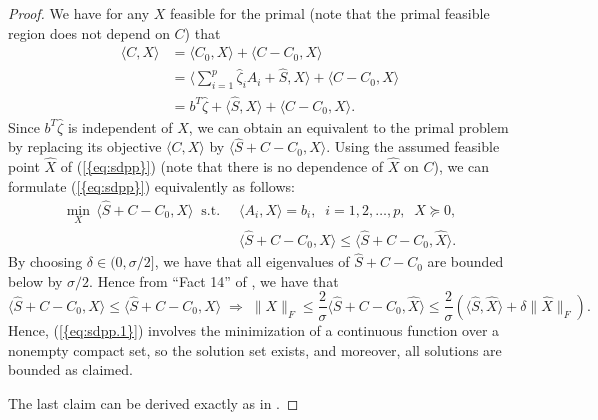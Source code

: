 \documentclass{siamltex}
\begin{document}
\begin{proof}
  We have for any $X$ feasible for the primal (note that the primal
  feasible region does not depend on $C$) that
\begin{align*}
\langle C,X \rangle &= \langle C_0,X \rangle +  \langle C-C_0,X \rangle \\
&= \langle \sum_{i=1}^p \hat{\zeta}_i A_i + \hat{S} ,X \rangle 
+  \langle C-C_0,X \rangle \\
&= b^T \hat{\zeta} + \langle \hat{S} ,X \rangle 
+  \langle C-C_0,X \rangle.
\end{align*}
Since $b^T \hat{\zeta}$ is independent of $X$, we can obtain an
equivalent to the primal problem by replacing its objective $\langle
C,X \rangle$ by $\langle \hat{S} + C-C_0,X \rangle$.  Using the
assumed feasible point $\hat{X}$ of {(\ref{{eq:sdpp}})} (note that there
is no dependence of $\hat{X}$ on $C$), we can formulate
{(\ref{{eq:sdpp}})} equivalently as follows:
\begin{subequations} \label{eq:sdpp.1}
\begin{align}
\min_X \, \langle \hat{S} + C-C_0 ,X \rangle \;\; \mbox{s.t.} \;\;& \langle A_i, X \rangle = b_i, \;\; i=1,2,\dotsc,p, \;\; X \succeq 0, \\
&\langle \hat{S} + C-C_0 ,X \rangle \le 
\langle \hat{S} + C-C_0 , \hat{X} \rangle.
\end{align}
\end{subequations}
By choosing $\delta \in (0, \sigma/2]$, we have that all eigenvalues
of $\hat{S} + C-C_0$ are bounded below by $\sigma/2$. Hence from
``Fact 14'' of \cite{Tod01a}, we have that
\[
\langle \hat{S} + C-C_0 ,X \rangle  \le 
\langle \hat{S} + C-C_0 , \hat{X} \rangle \; \Rightarrow \;
\|X\|_F \le \frac{2}{\sigma} \langle \hat{S} + C-C_0 , \hat{X} \rangle \le
\frac{2}{\sigma}  (
\langle \hat{S} , \hat{X} \rangle + \delta \| \hat{X} \|_F).
\]
Hence, {(\ref{{eq:sdpp.1}})} involves the minimization of a continuous
function over a nonempty compact set, so the solution set exists, and
moreover, all solutions are bounded as claimed.

The last claim can be derived exactly as in
\cite[Theorem~4.1]{Tod01a}.
\end{proof}
\end{document}
